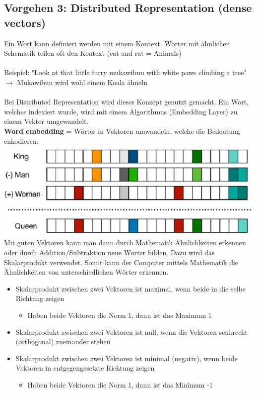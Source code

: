 \subsection{Vorgehen 3: Distributed Representation (dense vectors)}
Ein Wort kann definiert werden mit einem Kontext. Wörter mit ähnlicher Schematik teilen oft den Kontext (cat and rat = Animals)
\\\\
Beispiel: "Look at that little furry mukawibuu with white paws climbing a tree" $\rightarrow$ Mukawibuu wird wohl einem Koala ähneln
\\\\
Bei Distributed Representation wird dieses Konzept genutzt gemacht. Ein Wort, welches indexiert wurde, wird mit einem Algorithmus (Embedding Layer) zu einem Vektor umgewandelt.
\\
\textbf{Word embedding} = Wörter in Vektoren umwandeln, welche die Bedeutung enkodieren.
\includegraphics[width=\linewidth]{img/distrubuted-representation.png}
\\
Mit guten Vektoren kann man dann durch Mathematik Ähnlichkeiten erkennen oder durch Addition/Subtraktion neue Wörter bilden. Dazu wird das Skalarprodukt verwendet. Somit kann der Computer mittels Mathematik die Ähnlichkeiten von unterschiedlichen Wörter erkennen.

\begin{itemize}
\item Skalarprodukt zwischen zwei Vektoren ist maximal, wenn beide in die selbe Richtung zeigen
\begin{itemize}
\item Haben beide Vektoren die Norm 1, dann ist das Maximum 1
\end{itemize}
\item Skalarprodukt zwischen zwei Vektoren ist null, wenn die Vektoren senkrecht (orthogonal) zueinander stehen
\item Skalarprodukt zwischen zwei Vektoren ist minimal (negativ), wenn beide Vektoren in entgegengesetzte Richtung zeigen
\begin{itemize}
\item Haben beide Vektoren die Norm 1, dann ist das Minimum -1
\end{itemize}
\end{itemize}

